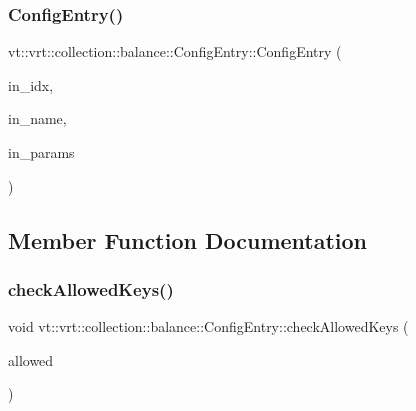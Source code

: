 \subsubsection{\texorpdfstring{Config\+Entry()}{ConfigEntry()}}
{\footnotesize\ttfamily vt\+::vrt\+::collection\+::balance\+::\+Config\+Entry\+::\+Config\+Entry (\begin{DoxyParamCaption}\item[{\hyperlink{namespacevt_1_1vrt_1_1collection_1_1balance_ac1bb9eee8129549177880dbb4e5f6a34}{Config\+Index} const}]{in\+\_\+idx,  }\item[{std\+::string const}]{in\+\_\+name,  }\item[{\hyperlink{structvt_1_1vrt_1_1collection_1_1balance_1_1_config_entry_a23bc47f965b2069f4015c839a9e1f66d}{Param\+Map\+Type}}]{in\+\_\+params }\end{DoxyParamCaption})\hspace{0.3cm}{\ttfamily [inline]}}



\subsection{Member Function Documentation}
\mbox{\label{structvt_1_1vrt_1_1collection_1_1balance_1_1_config_entry_ab4cc68a4675c9480c3086596b7afbb6e}} 
\subsubsection{\texorpdfstring{check\+Allowed\+Keys()}{checkAllowedKeys()}}
{\footnotesize\ttfamily void vt\+::vrt\+::collection\+::balance\+::\+Config\+Entry\+::check\+Allowed\+Keys (\begin{DoxyParamCaption}\item[{std\+::vector$<$ std\+::string $>$ const \&}]{allowed }\end{DoxyParamCaption})\hspace{0.3cm}{\ttfamily [inline]}}

\mbox{\label{structvt_1_1vrt_1_1collection_1_1balance_1_1_config_entry_aaf70eb658ff7c6407d9f97d350ab2bbe}} 
